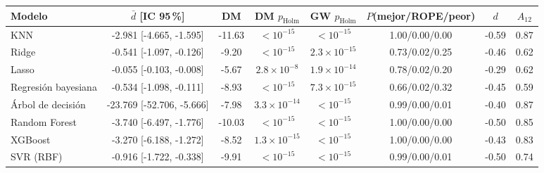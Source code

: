 \begin{tabular}{lccccccc}
\toprule
Modelo & $\bar d$ [IC 95\,\%] & DM & DM $p_{\mathrm{Holm}}$ & GW $p_{\mathrm{Holm}}$ & $P$(mejor/ROPE/peor) & $d$ & $A_{12}$ \\
\midrule
KNN & -2.981 [-4.665, -1.595] & -11.63 & $<10^{-15}$ & $<10^{-15}$ & 1.00/0.00/0.00 & -0.59 & 0.87 \\
Ridge & -0.541 [-1.097, -0.126] & -9.20 & $<10^{-15}$ & $2.3\times10^{-15}$ & 0.73/0.02/0.25 & -0.46 & 0.62 \\
Lasso & -0.055 [-0.103, -0.008] & -5.67 & $2.8\times10^{-8}$ & $1.9\times10^{-14}$ & 0.78/0.02/0.20 & -0.29 & 0.62 \\
Regresión bayesiana & -0.534 [-1.098, -0.111] & -8.93 & $<10^{-15}$ & $7.3\times10^{-15}$ & 0.66/0.02/0.32 & -0.45 & 0.59 \\
Árbol de decisión & -23.769 [-52.706, -5.666] & -7.98 & $3.3\times10^{-14}$ & $<10^{-15}$ & 0.99/0.00/0.01 & -0.40 & 0.87 \\
Random Forest & -3.740 [-6.497, -1.776] & -10.03 & $<10^{-15}$ & $<10^{-15}$ & 1.00/0.00/0.00 & -0.50 & 0.85 \\
XGBoost & -3.270 [-6.188, -1.272] & -8.52 & $1.3\times10^{-15}$ & $<10^{-15}$ & 1.00/0.00/0.00 & -0.43 & 0.83 \\
SVR (RBF) & -0.916 [-1.722, -0.338] & -9.91 & $<10^{-15}$ & $<10^{-15}$ & 0.99/0.00/0.01 & -0.50 & 0.74 \\
\bottomrule
\end{tabular}